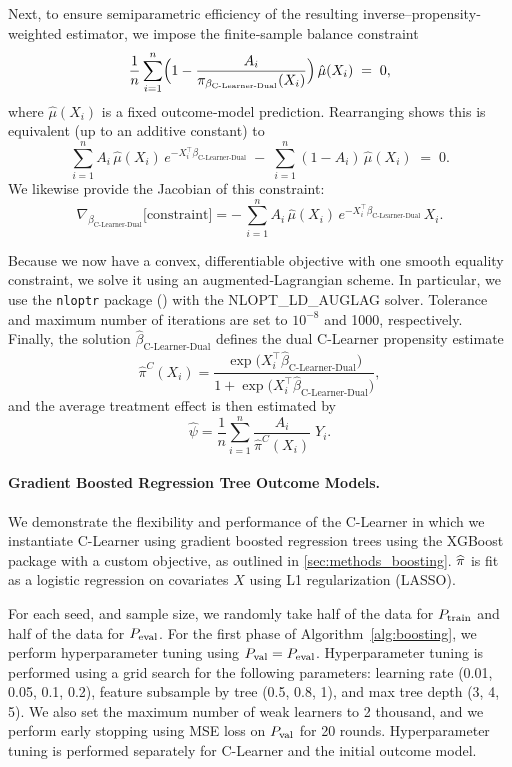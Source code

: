 Next, to ensure semiparametric efficiency of the resulting inverse–propensity‐weighted estimator, we impose the finite‐sample balance constraint
\[
\frac{1}{n}
\sum_{i=1}^n
\Bigl(1 - \frac{A_i}{\pi_{\beta_{\text{C-Learner-Dual}}}(X_i)}\Bigr)
\,\hat\mu(X_i)
\;=\;0,
\]
where \(\hat\mu(X_i)\) is a fixed outcome‐model prediction.  Rearranging shows this is equivalent (up to an additive constant) to
\[
\sum_{i=1}^n
A_i\,\hat\mu(X_i)\,e^{-X_i^\top \beta_{\text{C-Learner-Dual}}}
\;-\;
\sum_{i=1}^n
(1 - A_i)\,\hat\mu(X_i)
\;=\;
0.
\]
We likewise provide the Jacobian of this constraint:
\[
\nabla_{\beta_{\text{C-Learner-Dual}}}
\bigl[\text{constraint}\bigr]
=
-\,\sum_{i=1}^n
A_i\,\hat\mu(X_i)\,e^{-X_i^\top \beta_{\text{C-Learner-Dual}}}\,X_i.
\]

Because we now have a convex, differentiable objective with one smooth equality constraint, we solve it using an augmented‐Lagrangian scheme. In particular, we use the \texttt{nloptr} package (\cite{nloptr2023}) with the NLOPT\_LD\_AUGLAG solver. Tolerance and maximum number of iterations are set to $10^{-8}$ and 1000, respectively. Finally, the solution $\widehat\beta_{\text{C-Learner-Dual}}$ defines the dual C-Learner propensity estimate
\[
\widehat\pi^C(X_i)
=
\frac{\exp\bigl(X_i^\top \widehat\beta_{\text{C-Learner-Dual}}\bigr)}
     {1 + \exp\bigl(X_i^\top \widehat\beta_{\text{C-Learner-Dual}}\bigr)},
\]
and the average treatment effect is then estimated by
\label{sec:dual_details-end}
$$
\widehat\psi
=
\frac{1}{n}
\sum_{i=1}^n
\frac{A_i}{\widehat\pi^C(X_i)} \;Y_i.
$$


\ifdefined\response\newpage\newpage\clearpage\pagebreak\else\fi

\ifdefined\response\newpage\newpage\clearpage\pagebreak\else\fi

\paragraph{Gradient Boosted Regression Tree Outcome Models.} We demonstrate the flexibility and performance of the C-Learner in which we instantiate C-Learner using gradient boosted regression trees using the XGBoost package \citep{xgb} with a custom objective, as outlined in \cref{sec:methods_boosting}. $\widehat{\pi}$ is fit as a logistic regression on covariates $X$ using L1 regularization (LASSO). 

For each seed, and sample size, we randomly take half of the data for $P_{\rm train}$ 
and half of the data for $P_{\rm eval}$. For the first phase of Algorithm~\ref{alg:boosting}, we perform hyperparameter tuning using $P_{\rm val} = P_{\rm eval}$. Hyperparameter tuning is performed using a grid search for the following parameters: learning rate (0.01, 0.05, 0.1, 0.2), feature subsample by tree (0.5, 0.8, 1), and max tree depth (3, 4, 5). We also set the maximum number of weak learners to 2 thousand, and we perform early stopping using MSE loss on $P_{\rm val}$ for 20 rounds. Hyperparameter tuning is performed separately for C-Learner and the initial outcome model.

